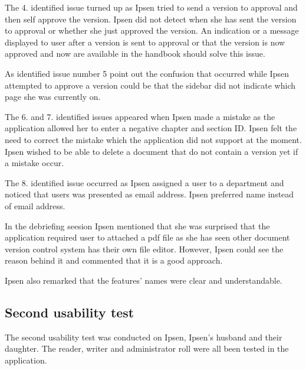 The 4. identified issue turned up as Ipsen tried to send a version to approval and then self approve the version.
Ipsen did not detect when she has sent the version to approval or whether she just approved the version. 
An indication or a message displayed to user after a version is sent to approval or that the version is now approved and now are available in the handbook should solve this issue.

As identified issue number 5 point out the confusion that occurred while Ipsen attempted to approve a version could be that the sidebar did not indicate which page she was currently on. 

The 6. and 7. identified issues appeared when Ipsen made a mistake as the application allowed her to enter a negative chapter and section ID. 
Ipsen felt the need to correct the mistake which the application did not support at the moment.
Ipsen wished to be able to delete a document that do not contain a version yet if a mistake occur.

The 8. identified issue occurred as Ipsen assigned a user to a department and noticed that users was presented as email address.
Ipsen preferred name instead of email address.

In the debriefing seesion Ipsen mentioned that she was surprised that the application required user to attached a pdf file as she has seen other document version control system has their own file editor.
However, Ipsen could see the reason behind it and commented that it is a good approach.

Ipsen also remarked that the features' names were clear and understandable. 





\subsection{Second usability test}
The second usability test was conducted on Ipsen, Ipsen's husband and their daughter. 
The reader, writer and administrator roll were all been tested in the application.

